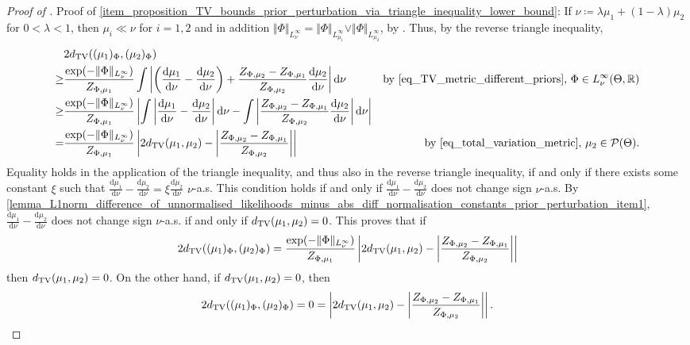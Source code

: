 \documentclass[a4paper]{scrartcl}
\theoremstyle{definition}
\numberwithin{equation}{section}
\newcommand{\R}{\mathbb{R}}
\newcommand{\rd}{\mathrm{d}}
\newcommand{\Abs}[1]{\left\vert#1\right\vert}
\newcommand{\norm}[1]{\Vert #1 \Vert}
\newcommand{\TV}[0]{\textup{TV}}
\begin{document}
\begin{proof}[Proof of ]
 Proof of \cref{item_proposition_TV_bounds_prior_perturbation_via_triangle_inequality_lower_bound}: If $\nu \coloneqq \lambda \mu_1+(1-\lambda)\mu_2$ for $0<\lambda <1$, then $\mu_i\ll\nu$ for $i=1,2$ and in addition $\norm{\Phi}_{L^\infty_\nu}=\norm{\Phi}_{L^\infty_{\mu_1}}\vee \norm{\Phi}_{L^\infty_{\mu_2}}$, by . 
 Thus, by the reverse triangle inequality,
\begin{align*}
  &2d_{\TV}((\mu_1)_\Phi,(\mu_2)_\Phi)
 \\
 \geq & \frac{\exp(-\norm{\Phi}_{L^\infty_\nu})}{Z_{\Phi,\mu_1}}  \int\Abs{ \left(\frac{\rd \mu_1}{\rd \nu}-\frac{\rd \mu_2}{\rd \nu}\right)+\frac{Z_{\Phi,\mu_2}-Z_{\Phi,\mu_1}}{Z_{\Phi,\mu_2}} \frac{\rd \mu_2}{\rd \nu}}\rd \nu  & \text{by \eqref{eq_TV_metric_different_priors}, $\Phi\in L^\infty_\nu(\Theta,\R)$}
 \\
 \geq &\frac{\exp(-\norm{\Phi}_{L^\infty_\nu})}{Z_{\Phi,\mu_1}} \Abs{\int\Abs{\frac{\rd \mu_1}{\rd \nu}-\frac{\rd \mu_2}{\rd \nu}}\rd \nu- \int\Abs{ \frac{Z_{\Phi,\mu_2}-Z_{\Phi,\mu_1}}{Z_{\Phi,\mu_2}} \frac{\rd \mu_2}{\rd \nu}}\rd \nu}
 \\
 =& \frac{\exp(-\norm{\Phi}_{L^\infty_\nu})}{Z_{\Phi,\mu_1}} \Abs{2d_{\TV}(\mu_1,\mu_2)- \Abs{ \frac{Z_{\Phi,\mu_2}-Z_{\Phi,\mu_1}}{Z_{\Phi,\mu_2}} }} & \text{by \eqref{eq_total_variation_metric}, $\mu_2\in\mathcal{P}(\Theta)$}.
\end{align*}
Equality holds in the application of the triangle inequality, and thus also in the reverse triangle inequality, if and only if there exists some constant $\xi$ such that $\tfrac{\rd\mu_1}{\rd\nu}-\tfrac{\rd\mu_2}{\rd\nu}=\xi \tfrac{\rd\mu_2}{\rd\nu}$ $\nu$-a.s.
This condition holds if and only if $\tfrac{\rd\mu_1}{\rd\nu}-\tfrac{\rd\mu_2}{\rd\nu}$ does not change sign $\nu$-a.s. 
By \ref{lemma_L1norm_difference_of_unnormalised_likelihoods_minus_abs_diff_normalisation_constants_prior_perturbation_item1},  $\tfrac{\rd\mu_1}{\rd\nu}-\tfrac{\rd\mu_2}{\rd\nu}$ does not change sign $\nu$-a.s. if and only if $d_{\TV}(\mu_1,\mu_2)=0$.
This proves that if 
\begin{equation*}
 2d_{\TV}((\mu_1)_\Phi,(\mu_2)_\Phi)=\frac{\exp(-\norm{\Phi}_{L^\infty_\nu})}{Z_{\Phi,\mu_1}} \Abs{2d_{\TV}(\mu_1,\mu_2)- \Abs{ \frac{Z_{\Phi,\mu_2}-Z_{\Phi,\mu_1}}{Z_{\Phi,\mu_2}} }}
\end{equation*}
then $d_{\TV}(\mu_1,\mu_2)=0$.
On the other hand, if $d_{\TV}(\mu_1,\mu_2)=0$, then 
\begin{equation*}
 2d_{\TV}((\mu_1)_\Phi,(\mu_2)_\Phi)=0=\Abs{2d_{\TV}(\mu_1,\mu_2)- \Abs{ \frac{Z_{\Phi,\mu_2}-Z_{\Phi,\mu_1}}{Z_{\Phi,\mu_2}} }}.
\end{equation*}
\end{proof}
\end{document}
